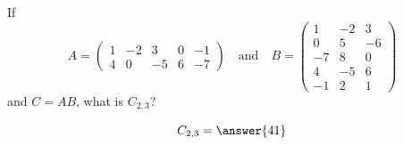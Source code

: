 \documentclass{ximera}
\begin{document}
\begin{question} If
  \[
    A = \begin{pmatrix}
      1 & -2 & 3 & 0 & -1 \\
      4 & 0 & -5 & 6 & -7
    \end{pmatrix}\quad\text{and}\quad
    B=
    \begin{pmatrix}
      1 & -2 & 3 \\
      0 & 5 & -6 \\
      -7 & 8 & 0 \\
      4 & -5 & 6 \\
      -1 & 2 & 1
    \end{pmatrix}
  \]
  and $C = AB$, what is $C_{2,3}$?
  \begin{prompt}
    \[
      C_{2,3} = \answer{41}
    \]
  \end{prompt}
\end{question}












\end{document}
